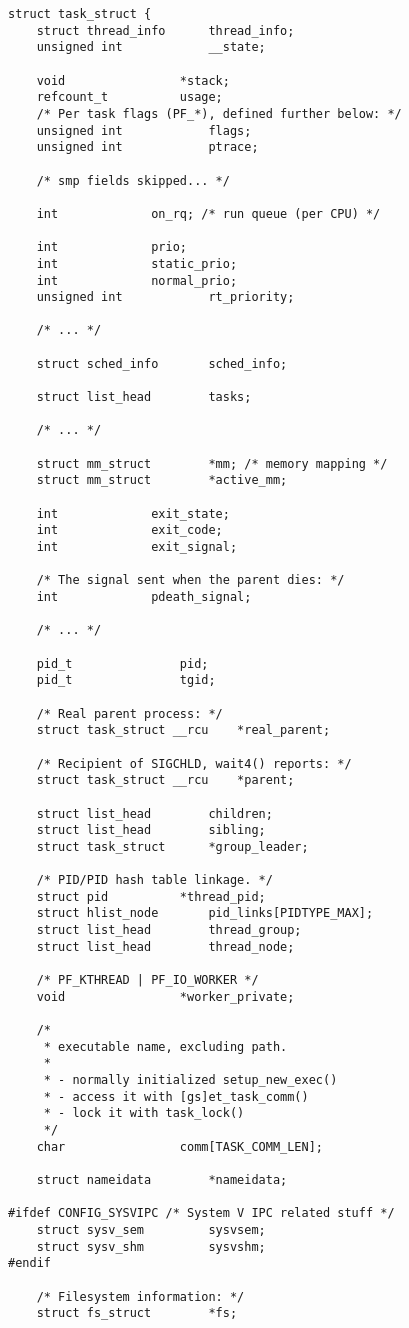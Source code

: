 
\begin{lstlisting}
struct task_struct {
	struct thread_info		thread_info;
	unsigned int			__state;

	void				*stack;
	refcount_t			usage;
	/* Per task flags (PF_*), defined further below: */
	unsigned int			flags;
	unsigned int			ptrace;

	/* smp fields skipped... */

	int				on_rq; /* run queue (per CPU) */

	int				prio;
	int				static_prio;
	int				normal_prio;
	unsigned int			rt_priority;

	/* ... */

	struct sched_info		sched_info;

	struct list_head		tasks;

	/* ... */

	struct mm_struct		*mm; /* memory mapping */
	struct mm_struct		*active_mm;

	int				exit_state;
	int				exit_code;
	int				exit_signal;

	/* The signal sent when the parent dies: */
	int				pdeath_signal;
	
	/* ... */

	pid_t				pid;
	pid_t				tgid;

	/* Real parent process: */
	struct task_struct __rcu	*real_parent;

	/* Recipient of SIGCHLD, wait4() reports: */
	struct task_struct __rcu	*parent;

	struct list_head		children;
	struct list_head		sibling;
	struct task_struct		*group_leader;

	/* PID/PID hash table linkage. */
	struct pid			*thread_pid;
	struct hlist_node		pid_links[PIDTYPE_MAX];
	struct list_head		thread_group;
	struct list_head		thread_node;

	/* PF_KTHREAD | PF_IO_WORKER */
	void				*worker_private;

	/*
	 * executable name, excluding path.
	 *
	 * - normally initialized setup_new_exec()
	 * - access it with [gs]et_task_comm()
	 * - lock it with task_lock()
	 */
	char				comm[TASK_COMM_LEN];

	struct nameidata		*nameidata;

#ifdef CONFIG_SYSVIPC /* System V IPC related stuff */
	struct sysv_sem			sysvsem;
	struct sysv_shm			sysvshm;
#endif

	/* Filesystem information: */
	struct fs_struct		*fs;


\end{lstlisting}
